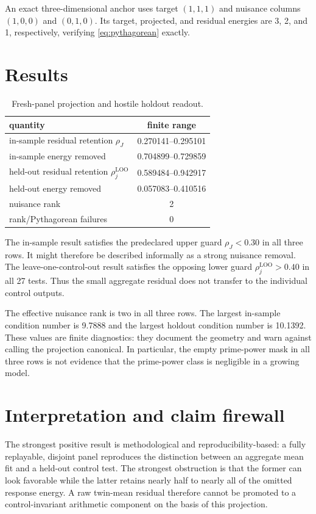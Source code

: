 \documentclass[10pt]{article}
\begin{document}
An exact three-dimensional anchor uses target $(1,1,1)$ and nuisance columns
$(1,0,0)$ and $(0,1,0)$.  Its target, projected, and residual energies are
3, 2, and 1, respectively, verifying \eqref{eq:pythagorean} exactly.

\section{Results}

\begin{table}[ht]
\centering\small
\caption{Fresh-panel projection and hostile holdout readout.}
\label{tab:results}
\begin{tabular}{lc}
\toprule
quantity & finite range\\
\midrule
in-sample residual retention $\rho_J$ & 0.270141--0.295101\\
in-sample energy removed & 0.704899--0.729859\\
held-out residual retention $\rho^{\mathrm{LOO}}_j$ & 0.589484--0.942917\\
held-out energy removed & 0.057083--0.410516\\
nuisance rank & 2\\
rank/Pythagorean failures & 0\\
\bottomrule
\end{tabular}
\end{table}

The in-sample result satisfies the predeclared upper guard $\rho_J<0.30$ in
all three rows.  It might therefore be described informally as a strong
nuisance removal.  The leave-one-control-out result satisfies the opposing
lower guard $\rho^{\mathrm{LOO}}_j>0.40$ in all 27 tests.  Thus the small
aggregate residual does not transfer to the individual control outputs.

The effective nuisance rank is two in all three rows.  The largest in-sample
condition number is 9.7888 and the largest holdout condition number is 10.1392.  These
values are finite diagnostics: they document the geometry and warn against
calling the projection canonical.  In particular, the empty prime-power mask
in all three rows is not evidence that the prime-power class is negligible in a
growing model.

\section{Interpretation and claim firewall}

The strongest positive result is methodological and reproducibility-based: a
fully replayable, disjoint panel reproduces the distinction between an
aggregate mean fit and a held-out control test.  The
strongest obstruction is that the former can look favorable while the latter
retains nearly half to nearly all of the omitted response energy.  A raw
twin-mean residual therefore cannot be promoted to a control-invariant
arithmetic component on the basis of this projection.
\end{document}
